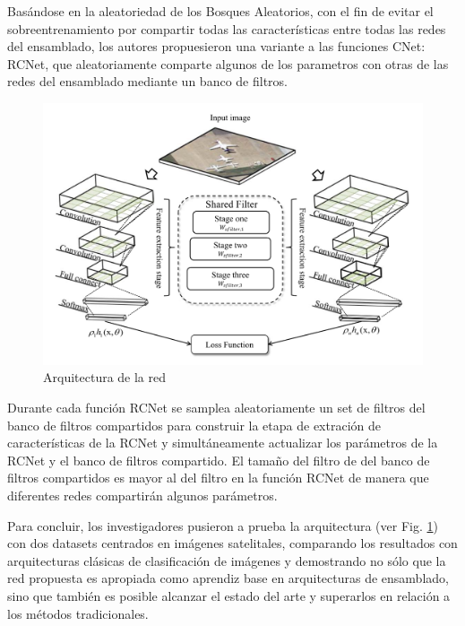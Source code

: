 Basándose en la aleatoriedad de los Bosques Aleatorios, con el fin de evitar el sobreentrenamiento por compartir todas las características entre todas las redes del ensamblado, los autores propuesieron una variante a las funciones CNet: RCNet, que aleatoriamente comparte algunos de los parametros con otras de las redes del ensamblado mediante un banco de filtros.

\begin{figure}[h]
	\centering
	\includegraphics[width=1\linewidth]{images/gbrcnn_architecture}
	\caption[Arquitectura de la red]{Arquitectura de la red}
	\label{fig:gbrcnnarchitecture}
\end{figure}


Durante cada función RCNet se samplea aleatoriamente un set de filtros del banco de filtros compartidos para construir la etapa de extración de características de la RCNet y simultáneamente actualizar los parámetros de la RCNet y el banco de filtros compartido. El tamaño del filtro de del banco de filtros compartidos es mayor al del filtro en la función RCNet de manera que diferentes redes compartirán algunos parámetros. 

Para concluir, los investigadores pusieron a prueba la arquitectura (ver Fig. \ref{fig:gbrcnnarchitecture}) con dos datasets centrados en imágenes satelitales, comparando los resultados con arquitecturas clásicas de clasificación de imágenes y demostrando no sólo que la red propuesta es apropiada como aprendiz base en arquitecturas de ensamblado, sino que también es posible alcanzar el estado del arte y superarlos en relación a los métodos tradicionales.

